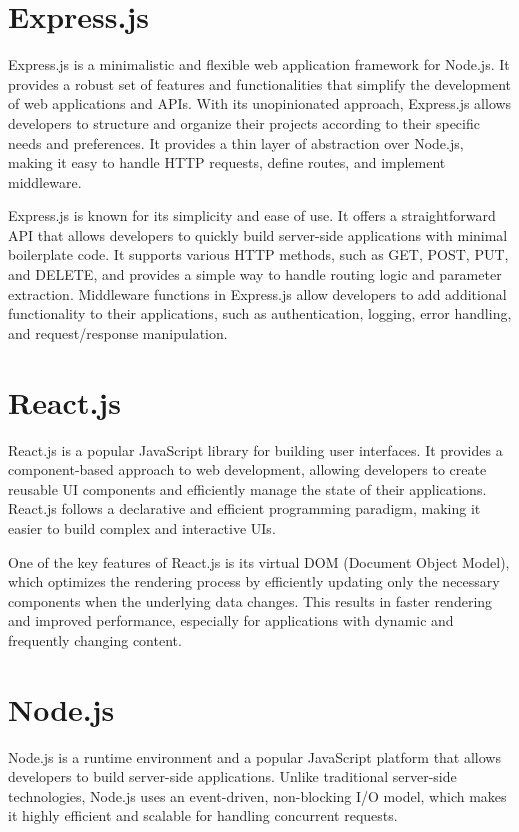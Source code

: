 \documentclass[a4paper,11pt]{report}
\begin{document}
\section{Express.js}
Express.js is a minimalistic and flexible web application framework for Node.js. It provides a robust set of features and functionalities that simplify the development of web applications and APIs. With its unopinionated approach, Express.js allows developers to structure and organize their projects according to their specific needs and preferences. It provides a thin layer of abstraction over Node.js, making it easy to handle HTTP requests, define routes, and implement middleware.

Express.js is known for its simplicity and ease of use. It offers a straightforward API that allows developers to quickly build server-side applications with minimal boilerplate code. It supports various HTTP methods, such as GET, POST, PUT, and DELETE, and provides a simple way to handle routing logic and parameter extraction. Middleware functions in Express.js allow developers to add additional functionality to their applications, such as authentication, logging, error handling, and request/response manipulation.

\section{React.js}
React.js is a popular JavaScript library for building user interfaces. It provides a component-based approach to web development, allowing developers to create reusable UI components and efficiently manage the state of their applications. React.js follows a declarative and efficient programming paradigm, making it easier to build complex and interactive UIs.

One of the key features of React.js is its virtual DOM (Document Object Model), which optimizes the rendering process by efficiently updating only the necessary components when the underlying data changes. This results in faster rendering and improved performance, especially for applications with dynamic and frequently changing content.

\section{Node.js}
Node.js is a runtime environment and a popular JavaScript platform that allows developers to build server-side applications. Unlike traditional server-side technologies, Node.js uses an event-driven, non-blocking I/O model, which makes it highly efficient and scalable for handling concurrent requests.
\end{document}
